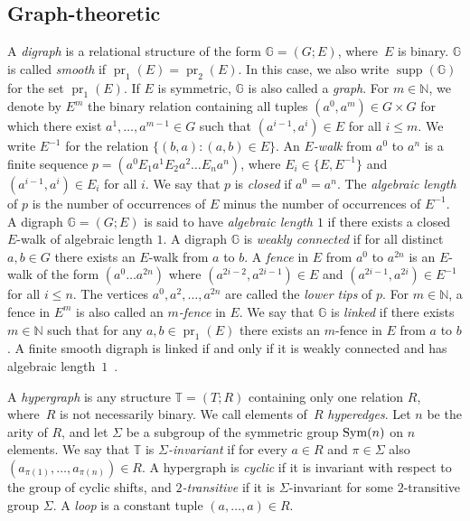 \documentclass[a4paper,reqno, cleveref]{amsart}
\newcommand{\coloneqq}{\mathrel{\mathop:}\mathrel{\mkern-1.2mu}=}
\newcommand{\N}{\mathbb{N}}
\DeclareMathOperator{\pr}{pr}
\DeclareMathOperator{\supp}{supp}
\newcommand{\sG}{\mathbb G}
\newcommand{\sT}{\mathbb T}
\newcommand{\johanna}[1]{\todo{\textbf{Johanna:} #1}}
\newcommand{\michael}[1]{\ \ \pdfcomment[author=Michael:,date=1,color=green]{#1}}
\begin{document}
\subsection{Graph-theoretic}
A \emph{digraph}  is a relational structure of the form $\sG=(G; E) $, where~$E$ is binary. 
$\sG$ is called \emph{smooth}  if $\pr_1(E)=\pr_2(E)$. In this case, we also write $\supp(\sG)$ for the set  $\pr_1(E)$.
If $E$ is symmetric, $\sG$ is also called a \emph{graph}. For $m \in \N$, we denote by $E^m$ the binary relation  containing all tuples $(a^0, a^m)%
\in G\times G$ for which there exist $a^1, \dots, a^{m-1}\in G$ such that $(a^{i-1}, a^i) \in E $ for all $i \leq m$. We write $E^{-1}$ 
for the relation $\{(b,a):(a,b) \in E\}$. 
%
An \emph{$E$-walk}  from $a^0$ to $a^n$ is a finite sequence $p=(a^0 E_1 a^1 E_2 a^2 \dots E_n a^n)$, where  $E_i \in \{E, E^{-1}\}$ and $(a^{i-1}, a^i)\in E_i$ for all $i$. We say that $p$ is \emph{closed} if $a^0=a^n$. The \emph{algebraic length} of $p$ is the number of occurrences of $E$ minus the number of occurrences of $E^{-1}$. A digraph $\sG=(G; E) $ is said to have \emph{algebraic length $1$} if there exists  a closed $E$-walk of algebraic length $1$. 
%
A digraph $\sG$ is \emph{weakly connected} if for all distinct  $a, b \in G$ there exists an $E$-walk from $a$ to $b$. %
%
A \emph{fence} in $E$ from $a^0$ to $a^{2n}$ is an $E$-walk of the form $(a^0\dots a^{2n})$ where 
 $(a^{2i-2},  a^{2i-1}) \in E $ and $(a^{2i-1},  a^{2i}) \in E^{-1}$ for all $i \leq n$.  The vertices   $a^0, a^2, \dots, a^{2n}$ are called the \emph{lower tips} of $p$. For $m\in \N$,  a fence in $E^m$ is also called an \emph{$m$-fence} in 
$E$. We say that  $\sG$ is \emph{linked} if there exists $m\in \N$ such that for any $a,b \in  \pr_1(E)$ 
there exists an $m$-fence in $E$ 
from $a$ to $b$. 
A finite smooth digraph is linked if and only if it is weakly connected and has algebraic length~$1$~\cite[Claim 3.8]{Cyclic}. 

A \emph{hypergraph} is any structure $\sT=(T; R)$ containing only one relation $R$, where~$R$ is not necessarily binary. We call elements of~$R$ \emph{hyperedges}. Let $n$ be the arity of $R$, and let $\Sigma$ be a subgroup of the symmetric group $\textnormal{Sym}(n)$ on $n$ elements.  
We say that $\sT$ is \emph{$\Sigma$-invariant} if for every $a\in R$ and $\pi \in \Sigma$ also $(a_{\pi(1)}, \dots,a_{\pi(n)}) \in R$.  A  hypergraph is %
\emph{cyclic} if it is invariant with respect to the group of cyclic shifts, and \emph{$2$-transitive} if it is $\Sigma$-invariant for some $2$-transitive group $\Sigma$.
         A \emph{loop} is a constant tuple $(a, \dots, a) \in R$. 
\end{document}
